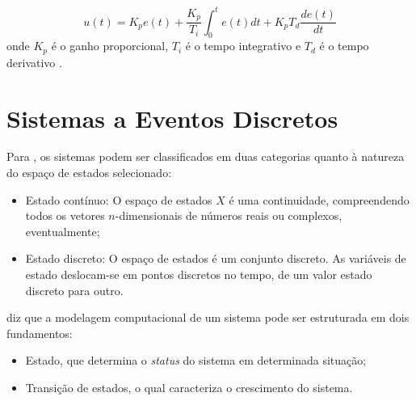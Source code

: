 \begin{equation}
 u(t) = K_pe(t) + \frac{K_p}{T_i}\int_{0}^{t}e(t)dt + K_pT_d\frac{de(t)}{dt}
\end{equation}
onde  $K_p$ é o ganho proporcional, $T_i$ é o tempo integrativo e $T_d$ é o tempo derivativo \cite{ogata}.


%
%


\vspace{1cm}
\section{Sistemas a Eventos Discretos} \label{cap:sed}


Para , os sistemas podem ser classificados em duas categorias quanto à natureza do espaço de estados 
selecionado: 
\begin{itemize}
 \item Estado contínuo: O espaço de estados $X$ é uma continuidade, compreendendo todos os vetores $n$-dimensionais de números reais ou 
 complexos, eventualmente;
 
 \item Estado discreto: O espaço de estados é um conjunto discreto. As variáveis de estado deslocam-se em pontos discretos no tempo, de 
 um valor estado discreto para outro.
\end{itemize}

 diz que a modelagem computacional de um sistema pode ser estruturada em dois fundamentos:
\begin{itemize}
 \item Estado, que determina o \textit{status} do sistema em determinada situação;
 \item Transição de estados, o qual caracteriza o crescimento do sistema.
\end{itemize}

